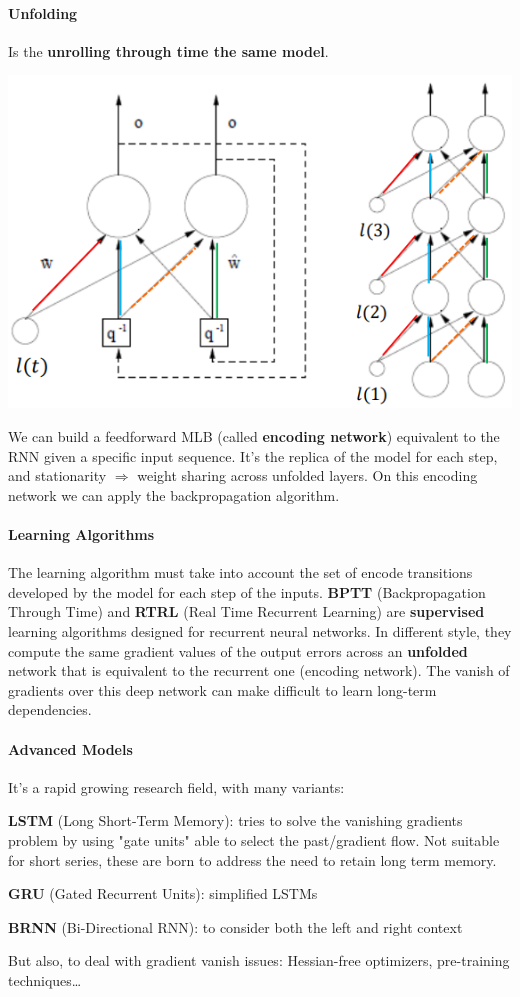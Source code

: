 \documentclass[10pt]{report}
\begin{document}
\paragraph{Unfolding} Is the \textbf{unrolling through time the same model}.
\begin{center}
	\includegraphics[scale=0.5]{38.png}
\end{center}
We can build a feedforward MLB (called \textbf{encoding network}) equivalent to the RNN given a specific input sequence. It's the replica of the model for each step, and stationarity $\Rightarrow$ weight sharing across unfolded layers. On this encoding network we can apply the backpropagation algorithm.
\paragraph{Learning Algorithms} The learning algorithm must take into account the set of encode transitions developed by the model for each step of the inputs. \textbf{BPTT} (Backpropagation Through Time) and \textbf{RTRL} (Real Time Recurrent Learning) are \textbf{supervised} learning algorithms designed for recurrent neural networks. In different style, they compute the same gradient values of the output errors across an \textbf{unfolded} network that is equivalent to the recurrent one (encoding network). The vanish of gradients over this deep network can make difficult to learn long-term dependencies.
\paragraph{Advanced Models} It's a rapid growing research field, with many variants:
\begin{list}{}{}
	\item \textbf{LSTM} (Long Short-Term Memory): tries to solve the vanishing gradients problem by using "gate units" able to select the past/gradient flow. Not suitable for short series, these are born to address the need to retain long term memory.
	\item \textbf{GRU} (Gated Recurrent Units): simplified LSTMs
	\item \textbf{BRNN} (Bi-Directional RNN): to consider both the left and right context
	\item But also, to deal with gradient vanish issues: Hessian-free optimizers, pre-training techniques\ldots
\end{list}
\end{document}
